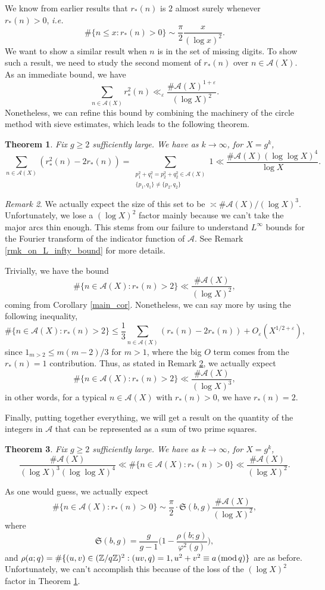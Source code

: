 \documentclass[12pt]{amsart}
\newtheorem{thm}{Theorem}[section]
\theoremstyle{definition}
\theoremstyle{definition}
\theoremstyle{remark}
\newtheorem{remark}[thm]{Remark}
\numberwithin{equation}{section}
\newcommand{\Z}{\mathbb{Z}}
\newcommand{\CA}{\mathcal{A}}
\renewcommand{\geq}{\geqslant}
\renewcommand{\leq}{\leqslant}
\renewcommand{\mod}[1]{\,({\rm mod}\,#1)}
\begin{document}
We know from earlier results that $r_*(n)$ is $2$ almost surely whenever $r_*(n)>0$, \textit{i.e.}
$$ \#\{ n\leq x : r_*(n) > 0 \} \sim \frac{\pi}{2} \frac{ x}{(\log x)^2} . $$
We want to show a similar result when $n$ is in the set of missing digits. To show such a result, we need to study the second moment of $r_*(n)$ over $n\in \CA(X)$. As an immediate bound, we have
$$ \sum_{n\in \CA(X)} r_*^2(n) \ll_{\varepsilon} \frac{\#\CA(X)^{1+\varepsilon}}{(\log X)^2}. $$
Nonetheless, we can refine this bound by combining the machinery of the circle method with sieve estimates, which leads to the following theorem.
\begin{thm}\label{off-diagonal_result}
Fix $g\geq 2$ sufficiently large. We have as $k\to\infty$, for $X=g^k$,
$$ \sum_{n\in \CA(X)} (r_*^2(n) - 2r_*(n)) = \sum_{\substack{p_1^2+q_1^2=p_2^2+q_2^2 \in \CA(X) \\ \{p_1,q_1\}\not=\{p_2,q_2\}}} 1 \ll \frac{\#\CA(X) (\log\log X)^4}{\log X} . $$
\end{thm}
\begin{remark}\label{off-diagonal-remark}
We actually expect the size of this set to be $\asymp \#\CA(X)/(\log X)^3$. Unfortunately, we lose a $(\log X)^2$ factor mainly because we can't take the major arcs thin enough. This stems from our failure to understand $L^{\infty}$ bounds for the Fourier transform of the indicator function of $\CA$. See Remark \ref{rmk_on_L_infty_bound} for more details.
\end{remark}
Trivially, we have the bound
$$ \#\{ n\in \CA(X) : r_*(n) > 2 \} \ll \frac{\#\CA(X)}{(\log X)^2}, $$
coming from Corollary \ref{main_cor}. Nonetheless, we can say more by using the following inequality,
$$ \#\{n\in \CA(X) : r_*(n) > 2\} \leq \frac{1}{3} \sum_{n\in \CA(X)} (r_*(n) - 2r_*(n)) +O_{\varepsilon}(X^{1/2+\varepsilon}),$$
since $1_{m>2} \leq m(m-2)/3$ for $m>1$, where the big $O$ term comes from the $r_*(n)=1$ contribution. Thus, as stated in Remark \ref{off-diagonal-remark}, we actually expect
$$ \#\{n\in \CA(X) : r_*(n) > 2\} \ll \frac{\#\CA(X)}{(\log X)^3}, $$
in other words, for a typical $n\in \CA(X)$ with $r_*(n)>0$, we have $r_*(n)=2$.


Finally, putting together everything, we will get a result on the quantity of the integers in $\CA$ that can be represented as a sum of two prime squares.
\begin{thm}\label{anatomy_result}
Fix $g\geq 2$ sufficiently large. We have as $k\to\infty$, for $X=g^k$,
$$ \frac{\#\CA(X)}{(\log X)^3 (\log\log X)^4} \ll \#\{ n\in \CA(X) : r_*(n) >0 \} \ll \frac{\#\CA(X)}{(\log X)^2}. $$
\end{thm}
As one would guess, we actually expect
$$ \#\{ n\in \CA(X) : r_*(n) >0 \} \sim \frac{\pi}{2}\cdot \mathfrak{S}(b,g) \frac{\#\CA(X)}{(\log X)^2}, $$
where 
$$ \mathfrak{S}(b,g)=\frac{g}{g-1} \bigg( 1 - \frac{\rho(b;g)}{\varphi^2(g)} \bigg) ,$$
and $\rho(a;q)=\#\{ (u,v)\in (\Z/q\Z)^2 : (uv,q)=1,  u^2+v^2\equiv a \mod q \}$ are as before. Unfortunately, we can't accomplish this because of the loss of the $(\log X)^2$ factor in Theorem \ref{off-diagonal_result}.
\end{document}
